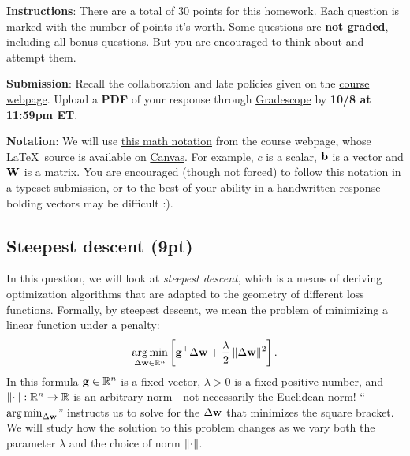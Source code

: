 \documentclass[12pt,letterpaper]{article}
\begin{document}
\textbf{Instructions}: There are a total of 30 points for this homework. Each question is marked with the number of points it's worth. Some questions are \textbf{not graded}, including all bonus questions. But you are encouraged to think about and attempt them.
  
\textbf{Submission}: Recall the collaboration and late policies given on the \href{https://phillipi.github.io/6.s898/}{course webpage}. Upload a \textbf{PDF} of your response through \href{https://www.gradescope.com/courses/599409}{Gradescope} by \textbf{10/8 at 11:59pm ET}.

  
\textbf{Notation}: We will use \href{https://phillipi.github.io/6.s898/materials/notation.pdf}{this math notation} from the course webpage, whose \LaTeX~source is available on \href{https://canvas.mit.edu/courses/22523}{Canvas}. For example, $c$ is a scalar, ${\mathbf{b}}$ is a vector and ${\mathbf{W}}$ is a matrix. You are encouraged (though not forced) to follow this notation in a typeset submission, 
 or to the best of your ability in a handwritten response---bolding vectors may be difficult :). 

\noindent\makebox[\linewidth]{\rule{\linewidth}{0.4pt}}

\vspace{-0.2in}

\subsection*{Steepest descent (9pt)}

In this question, we will look at \textit{steepest descent}, which is a means of deriving optimization algorithms that are adapted to the geometry of different loss functions. Formally, by steepest descent, we mean the problem of minimizing a linear function under a penalty:
\begin{align}\label{eq:steepest}
    \operatorname*{arg\,min}_{\Delta {\mathbf{w}} \in \mathbb{R}^n} \left[{\mathbf{g}}^\top \Delta {\mathbf{w}} + \frac{\lambda}{2} \, \Vert {\Delta {\mathbf{w}}} \Vert^2 \right].
\end{align}
In this formula ${\mathbf{g}}\in\mathbb{R}^n$ is a fixed vector, $\lambda >0$ is a fixed positive number, and $\Vert {\cdot} \Vert:\mathbb{R}^n \to \mathbb{R}$ is an arbitrary norm---not necessarily the Euclidean norm! ``$\operatorname*{arg\,min}_{\Delta {\mathbf{w}}}$'' instructs us to solve for the $\Delta {\mathbf{w}}$ that minimizes the square bracket. We will study how the solution to this problem changes as we vary both the parameter $\lambda$ and the choice of norm $\Vert {\cdot} \Vert$.
\end{document}
